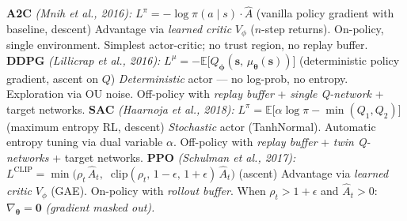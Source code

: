 \documentclass[11pt]{article}
\begin{document}
\begin{algorithm}[t]
\caption{Key Differences: All Nine Algorithms}\label{alg:compare}
\begin{algorithmic}[0]
\Statex \textbf{A2C} \textit{(Mnih et al., 2016):}
\Statex \hspace{\algorithmicindent} $L^\pi = -\log\pi(a \mid s) \cdot \hat{A}$ \; (vanilla policy gradient with baseline, descent)
\Statex \hspace{\algorithmicindent} Advantage via \textit{learned critic} $V_\phi$ ($n$-step returns). On-policy, single environment.
\Statex \hspace{\algorithmicindent} Simplest actor-critic; no trust region, no replay buffer.
\Statex
\Statex \textbf{DDPG} \textit{(Lillicrap et al., 2016):}
\Statex \hspace{\algorithmicindent} $L^\mu = -\mathbb{E}\big[Q_{\boldsymbol{\phi}}(\mathbf{s},\, \mu_{\boldsymbol{\theta}}(\mathbf{s}))\big]$ \; (deterministic policy gradient, ascent on $Q$)
\Statex \hspace{\algorithmicindent} \textit{Deterministic} actor --- no log-prob, no entropy. Exploration via OU noise.
\Statex \hspace{\algorithmicindent} Off-policy with \textit{replay buffer} + \textit{single Q-network} + target networks.
\Statex
\Statex \textbf{SAC} \textit{(Haarnoja et al., 2018):}
\Statex \hspace{\algorithmicindent} $L^\pi = \mathbb{E}\big[\alpha \log\pi - \min(Q_1, Q_2)\big]$ \; (maximum entropy RL, descent)
\Statex \hspace{\algorithmicindent} \textit{Stochastic} actor (TanhNormal). Automatic entropy tuning via dual variable $\alpha$.
\Statex \hspace{\algorithmicindent} Off-policy with \textit{replay buffer} + \textit{twin Q-networks} + target networks.
\Statex
\Statex \textbf{PPO} \textit{(Schulman et al., 2017):}
\Statex \hspace{\algorithmicindent} $L^{\text{CLIP}} = \min\!\big(\rho_t\, \hat{A}_t,\;\; \text{clip}(\rho_t,\, 1{-}\epsilon,\, 1{+}\epsilon)\, \hat{A}_t\big)$ \; (ascent)
\Statex \hspace{\algorithmicindent} Advantage via \textit{learned critic} $V_\phi$ (GAE). On-policy with \textit{rollout buffer}.
\Statex \hspace{\algorithmicindent} When $\rho_t > 1{+}\epsilon$ and $\hat{A}_t > 0$: $\nabla_{\boldsymbol{\theta}} = \mathbf{0}$ \textit{(gradient masked out).}

\end{algorithmic}
\end{algorithm}
\end{document}
